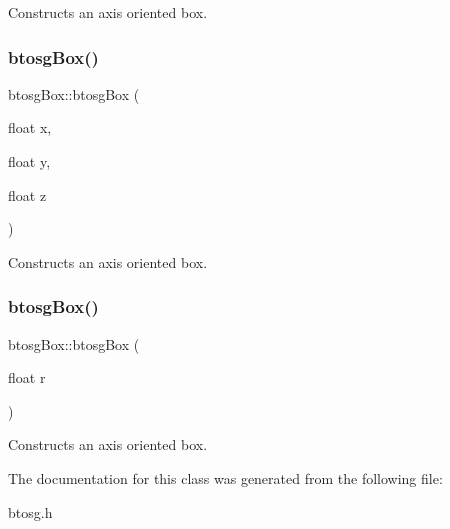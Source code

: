 Constructs an axis oriented box. \mbox{\label{classbtosgBox_a0b7809cf498d50ced7c6e4a1bf0f5470}} 
\subsubsection{\texorpdfstring{btosg\+Box()}{btosgBox()}\hspace{0.1cm}{\footnotesize\ttfamily [2/3]}}
{\footnotesize\ttfamily btosg\+Box\+::btosg\+Box (\begin{DoxyParamCaption}\item[{float}]{x,  }\item[{float}]{y,  }\item[{float}]{z }\end{DoxyParamCaption})\hspace{0.3cm}{\ttfamily [inline]}}

Constructs an axis oriented box. \mbox{\label{classbtosgBox_a3b17e84e3f94aabdc7b8517bd802a5c9}} 
\subsubsection{\texorpdfstring{btosg\+Box()}{btosgBox()}\hspace{0.1cm}{\footnotesize\ttfamily [3/3]}}
{\footnotesize\ttfamily btosg\+Box\+::btosg\+Box (\begin{DoxyParamCaption}\item[{float}]{r }\end{DoxyParamCaption})\hspace{0.3cm}{\ttfamily [inline]}}

Constructs an axis oriented box. 

The documentation for this class was generated from the following file\+:\begin{DoxyCompactItemize}
\item 
btosg.\+h\end{DoxyCompactItemize}
